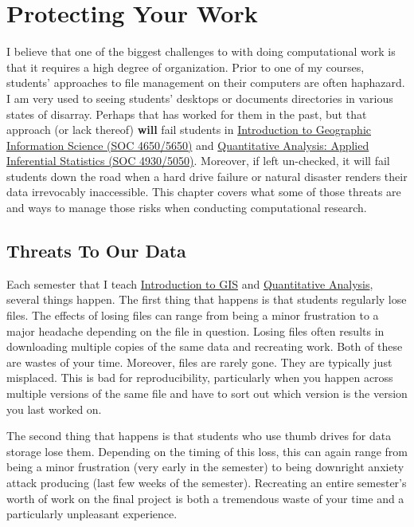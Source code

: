 \documentclass[]{book}
\theoremstyle{definition}
\theoremstyle{definition}
\theoremstyle{definition}
\theoremstyle{remark}
\begin{document}
\chapter{Protecting Your Work}\label{protecting-your-work}

I believe that one of the biggest challenges to with doing computational
work is that it requires a high degree of organization. Prior to one of
my courses, students' approaches to file management on their computers
are often haphazard. I am very used to seeing students' desktops or
documents directories in various states of disarray. Perhaps that has
worked for them in the past, but that approach (or lack thereof)
\textbf{will} fail students in
\href{https://slu-soc5650.github.io}{Introduction to Geographic
Information Science (SOC 4650/5650)} and
\href{https://slu-soc5050.github.io}{Quantitative Analysis: Applied
Inferential Statistics (SOC 4930/5050)}. Moreover, if left un-checked,
it will fail students down the road when a hard drive failure or natural
disaster renders their data irrevocably inaccessible. This chapter
covers what some of those threats are and ways to manage those risks
when conducting computational research.

\section{Threats To Our Data}\label{threats-to-our-data}

Each semester that I teach
\href{https://slu-soc5650.github.io}{Introduction to GIS} and
\href{https://slu-soc5050.github.io}{Quantitative Analysis}, several
things happen. The first thing that happens is that students regularly
lose files. The effects of losing files can range from being a minor
frustration to a major headache depending on the file in question.
Losing files often results in downloading multiple copies of the same
data and recreating work. Both of these are wastes of your time.
Moreover, files are rarely gone. They are typically just misplaced. This
is bad for reproducibility, particularly when you happen across multiple
versions of the same file and have to sort out which version is the
version you last worked on.

The second thing that happens is that students who use thumb drives for
data storage lose them. Depending on the timing of this loss, this can
again range from being a minor frustration (very early in the semester)
to being downright anxiety attack producing (last few weeks of the
semester). Recreating an entire semester's worth of work on the final
project is both a tremendous waste of your time and a particularly
unpleasant experience.
\end{document}
